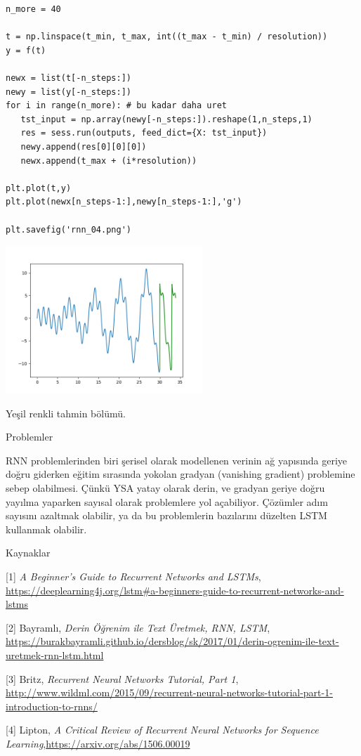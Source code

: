 \documentclass[12pt,fleqn]{article}\usepackage{../../common}
\begin{document}
\begin{verbatim}
n_more = 40

t = np.linspace(t_min, t_max, int((t_max - t_min) / resolution))
y = f(t)

newx = list(t[-n_steps:])
newy = list(y[-n_steps:])
for i in range(n_more): # bu kadar daha uret
   tst_input = np.array(newy[-n_steps:]).reshape(1,n_steps,1) 
   res = sess.run(outputs, feed_dict={X: tst_input})
   newy.append(res[0][0][0])
   newx.append(t_max + (i*resolution))

plt.plot(t,y)
plt.plot(newx[n_steps-1:],newy[n_steps-1:],'g')

plt.savefig('rnn_04.png')
\end{verbatim}

\includegraphics[width=20em]{rnn_04.png}

Yeşil renkli tahmin bölümü. 

Problemler

RNN problemlerinden biri şerisel olarak modellenen verinin ağ yapısında
geriye doğru giderken eğitim sırasında yokolan gradyan (vanishing gradient)
problemine sebep olabilmesi. Çünkü YSA yatay olarak derin, ve gradyan
geriye doğru yayılma yaparken sayısal olarak problemlere yol
açabiliyor. Çözümler adım sayısını azaltmak olabilir, ya da bu problemlerin
bazılarını düzelten LSTM kullanmak olabilir.

Kaynaklar

[1] {\em A Beginner's Guide to Recurrent Networks and LSTMs}, 
    \url{https://deeplearning4j.org/lstm#a-beginners-guide-to-recurrent-networks-and-lstms}

[2] Bayramlı, 
    {\em Derin Öğrenim ile Text Üretmek, RNN, LSTM}, 
    \url{https://burakbayramli.github.io/dersblog/sk/2017/01/derin-ogrenim-ile-text-uretmek-rnn-lstm.html}

[3] Britz, {\em Recurrent Neural Networks Tutorial, Part 1}, \url{http://www.wildml.com/2015/09/recurrent-neural-networks-tutorial-part-1-introduction-to-rnns/}

[4] Lipton, {\em A Critical Review of Recurrent Neural Networks for Sequence Learning},\url{https://arxiv.org/abs/1506.00019}
\end{document}
